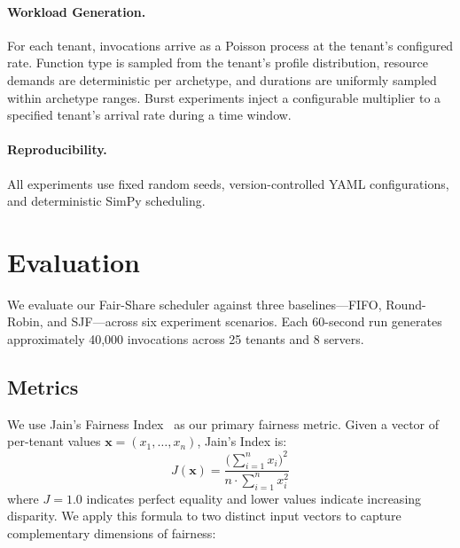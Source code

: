 \documentclass[runningheads]{llncs}
\begin{document}
\paragraph{Workload Generation.}
For each tenant, invocations arrive as a Poisson process at the tenant's configured rate. Function type is sampled from the tenant's profile distribution, resource demands are deterministic per archetype, and durations are uniformly sampled within archetype ranges. Burst experiments inject a configurable multiplier to a specified tenant's arrival rate during a time window.

\paragraph{Reproducibility.}
All experiments use fixed random seeds, version-controlled YAML configurations, and deterministic SimPy scheduling.

\section{Evaluation}\label{sec:evaluation}

We evaluate our Fair-Share scheduler against three baselines---FIFO, Round-Robin, and SJF---across six experiment scenarios. Each 60-second run generates approximately 40,000 invocations across 25 tenants and 8 servers.

\subsection{Metrics}

We use Jain's Fairness Index~\cite{jain1984quantitative} as our primary fairness metric. Given a vector of per-tenant values $\mathbf{x} = (x_1, \ldots, x_n)$, Jain's Index is:
\begin{equation}\label{eq:jains}
    J(\mathbf{x}) = \frac{\big(\sum_{i=1}^{n} x_i\big)^2}{n \cdot \sum_{i=1}^{n} x_i^2}
\end{equation}
where $J = 1.0$ indicates perfect equality and lower values indicate increasing disparity. We apply this formula to two distinct input vectors to capture complementary dimensions of fairness:
\end{document}
